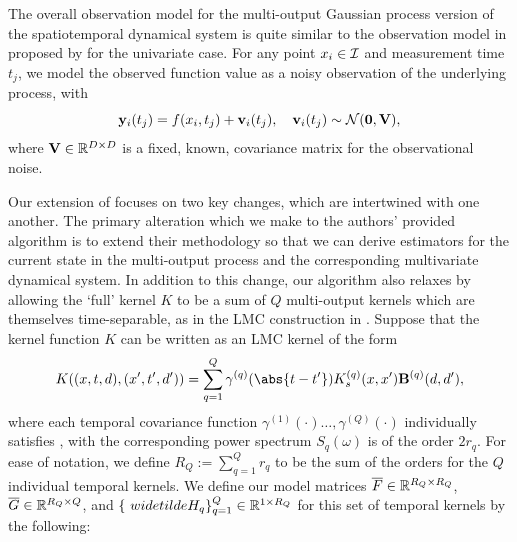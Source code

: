 \documentclass[10pt]{article}
\numberwithin{equation}{section}
\begin{document}
The overall observation model for the multi-output Gaussian process version of the spatiotemporal dynamical system is quite similar to the observation model in  proposed by \citeauthor{Todescato-Efficient-2020} for the univariate case. For any point $x_{i} \in \mathcal{I}$ and measurement time $t_{j}$, we model the observed function value as a noisy observation of the underlying process, with
\begin{equation}
\label{eq:MOGP-obs-model}
    \mathbf{y}_{i}(t_{j}) = f(x_{i}, t_{j}) + \mathbf{v}_{i}(t_{j}), \quad \mathbf{v}_{i}(t_{j}) \sim \mathcal{N}(\mathbf{0}, \mathbf{V}),
\end{equation}
where $\mathbf{V} \in \mathbb{R}^{D \times D}$ is a fixed, known, covariance matrix for the observational noise.

Our extension of  focuses on two key changes, which are intertwined with one another. The primary alteration which we make to the authors' provided algorithm is to extend their methodology so that we can derive estimators for the current state in the multi-output process and the corresponding multivariate dynamical system. In addition to this change, our algorithm also relaxes  by allowing the `full' kernel $K$ to be a sum of $Q$ multi-output kernels which are themselves time-separable, as in the LMC construction in . Suppose that the kernel function $K$ can be written as an LMC kernel of the form
\begin{equation}
    K((x, t, d), (x', t', d')) = \sum_{q=1}^{Q} \gamma^{(q)}(\abs{t - t'}) K_{s}^{(q)}(x, x') \bfB^{(q)}(d, d'),
\end{equation}
where each temporal covariance function $\gamma^{(1)}(\cdot) \dots, \gamma^{(Q)}(\cdot)$ individually satisfies , with the corresponding power spectrum $S_{q}(\omega)$ is of the order $2r_{q}$. For ease of notation, we define $R_{Q} := \sum_{q=1}^{Q}r_{q}$ to be the sum of the orders for the $Q$ individual temporal kernels. We define our model matrices $\overline{F} \in \mathbb{R}^{R_{Q} \times R_{Q}}$, $\overline{G} \in \mathbb{R}^{R_{Q} \times Q}$, and $\{\   widetilde{H}_{q}\}_{q=1}^{Q} \in \mathbb{R}^{1 \times R_{Q}}$ for this set of temporal kernels by the following:
\end{document}
